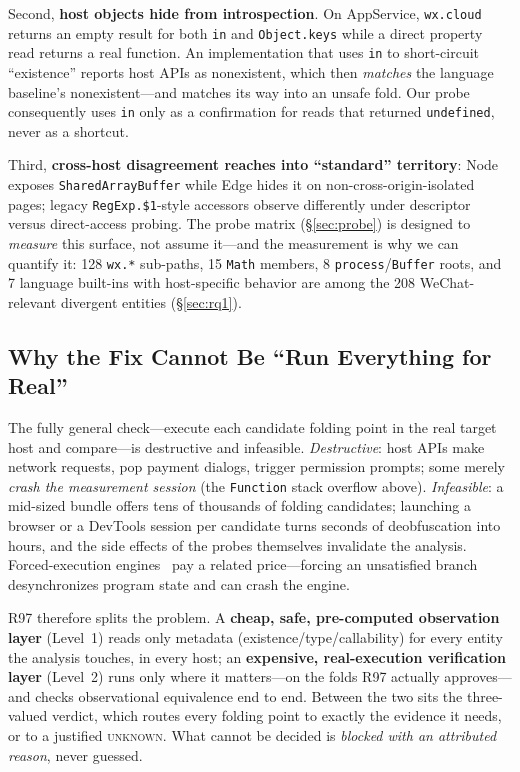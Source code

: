 \documentclass[sigconf,nonacm]{acmart}
\begin{document}
Second, \textbf{host objects hide from introspection}. On AppService, \texttt{wx.cloud} returns an empty result for both \texttt{in} and \texttt{Object.keys} while a direct property read returns a real function. An implementation that uses \texttt{in} to short-circuit ``existence'' reports host APIs as nonexistent, which then \emph{matches} the language baseline's nonexistent---and matches its way into an unsafe fold. Our probe consequently uses \texttt{in} only as a confirmation for reads that returned \texttt{undefined}, never as a shortcut.

Third, \textbf{cross-host disagreement reaches into ``standard'' territory}: Node exposes \texttt{SharedArrayBuffer} while Edge hides it on non-cross-origin-isolated pages; legacy \texttt{RegExp.\$1}-style accessors observe differently under descriptor versus direct-access probing. The probe matrix (\S\ref{sec:probe}) is designed to \emph{measure} this surface, not assume it---and the measurement is why we can quantify it: 128 \texttt{wx.*} sub-paths, 15 \texttt{Math} members, 8 \texttt{process}/\texttt{Buffer} roots, and 7 language built-ins with host-specific behavior are among the 208 WeChat-relevant divergent entities (\S\ref{sec:rq1}).

\subsection{Why the Fix Cannot Be ``Run Everything for Real''}

The fully general check---execute each candidate folding point in the real target host and compare---is destructive and infeasible. \emph{Destructive}: host APIs make network requests, pop payment dialogs, trigger permission prompts; some merely \emph{crash the measurement session} (the \texttt{Function} stack overflow above). \emph{Infeasible}: a mid-sized bundle offers tens of thousands of folding candidates; launching a browser or a DevTools session per candidate turns seconds of deobfuscation into hours, and the side effects of the probes themselves invalidate the analysis. Forced-execution engines~\cite{fv8} pay a related price---forcing an unsatisfied branch desynchronizes program state and can crash the engine.

R97 therefore splits the problem. A \textbf{cheap, safe, pre-computed observation layer} (Level~1) reads only metadata (existence/type/callability) for every entity the analysis touches, in every host; an \textbf{expensive, real-execution verification layer} (Level~2) runs only where it matters---on the folds R97 actually approves---and checks observational equivalence end to end. Between the two sits the three-valued verdict, which routes every folding point to exactly the evidence it needs, or to a justified \textsc{unknown}. What cannot be decided is \emph{blocked with an attributed reason}, never guessed.
\end{document}
